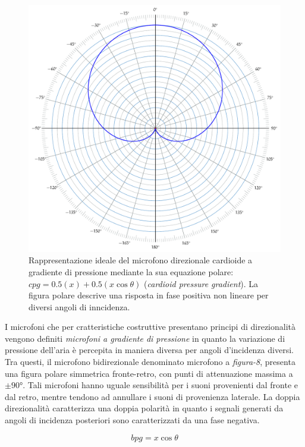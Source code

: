 \begin{figure}[t]
\centering
\includegraphics[width=1\columnwidth]{CAPITOLI/_TIKZ/POLAR/cardioid}
\caption{Rappresentazione ideale del microfono direzionale cardioide a gradiente
di pressione mediante la sua equazione polare: $cpg = 0.5(x) + 0.5(x\cos\theta)$
(\emph{cardioid pressure gradient}). La figura polare descrive una risposta in
fase positiva non lineare per diversi angoli di inncidenza.}
\label{polar:cardioid}
\end{figure}

I microfoni che per cratteristiche costruttive presentano principi di direzionalità
vengono definiti \emph{microfoni a gradiente di pressione} in quanto la variazione
di pressione dell'aria è percepita in maniera diversa per angoli d'incidenza diversi.
Tra questi, il microfono bidirezionale denominato microfono a \emph{figura-8},
presenta una figura polare simmetrica fronte-retro, con punti di attenuazione
massima a $\pm90°$. Tali microfoni hanno uguale sensibilità per i suoni
provenienti dal fronte e dal retro, mentre tendono ad annullare i suoni di
provenienza laterale. La doppia direzionalità caratterizza una doppia polarità
in quanto i segnali generati da angoli di incidenza posteriori sono caratterizzati da
una fase negativa.

\begin{equation}
bpg = x\cos\theta
\label{eq:fig8}
\end{equation}

